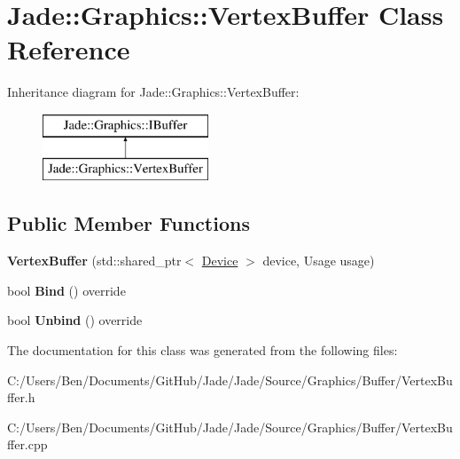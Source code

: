 \hypertarget{class_jade_1_1_graphics_1_1_vertex_buffer}{}\section{Jade\+:\+:Graphics\+:\+:Vertex\+Buffer Class Reference}
\label{class_jade_1_1_graphics_1_1_vertex_buffer}
Inheritance diagram for Jade\+:\+:Graphics\+:\+:Vertex\+Buffer\+:\begin{figure}[H]
\begin{center}
\leavevmode
\includegraphics[height=2.000000cm]{class_jade_1_1_graphics_1_1_vertex_buffer}
\end{center}
\end{figure}
\subsection*{Public Member Functions}
\begin{DoxyCompactItemize}
\item 
\hypertarget{class_jade_1_1_graphics_1_1_vertex_buffer_a96798cd6ed38b6d7288faa0f5f8db277}{}{\bfseries Vertex\+Buffer} (std\+::shared\+\_\+ptr$<$ \hyperlink{class_jade_1_1_graphics_1_1_device}{Device} $>$ device, Usage usage)\label{class_jade_1_1_graphics_1_1_vertex_buffer_a96798cd6ed38b6d7288faa0f5f8db277}

\item 
\hypertarget{class_jade_1_1_graphics_1_1_vertex_buffer_ad65fcc534d162a6cfcc2e9e21da0ec5e}{}bool {\bfseries Bind} () override\label{class_jade_1_1_graphics_1_1_vertex_buffer_ad65fcc534d162a6cfcc2e9e21da0ec5e}

\item 
\hypertarget{class_jade_1_1_graphics_1_1_vertex_buffer_a772431c912eb34bb2e8b61df6e819186}{}bool {\bfseries Unbind} () override\label{class_jade_1_1_graphics_1_1_vertex_buffer_a772431c912eb34bb2e8b61df6e819186}

\end{DoxyCompactItemize}


The documentation for this class was generated from the following files\+:\begin{DoxyCompactItemize}
\item 
C\+:/\+Users/\+Ben/\+Documents/\+Git\+Hub/\+Jade/\+Jade/\+Source/\+Graphics/\+Buffer/Vertex\+Buffer.\+h\item 
C\+:/\+Users/\+Ben/\+Documents/\+Git\+Hub/\+Jade/\+Jade/\+Source/\+Graphics/\+Buffer/Vertex\+Buffer.\+cpp\end{DoxyCompactItemize}
